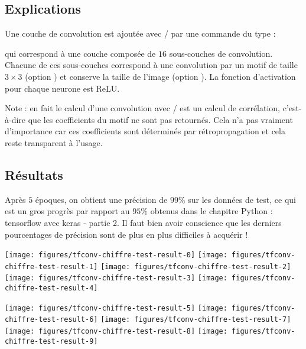 \documentclass[11pt,class=report,crop=false]{standalone}
\begin{document}
\subsection{Explications}

Une couche de convolution est ajoutée avec \tensorflow/\keras{} par une commande du type :

qui correspond à une couche composée de $16$ sous-couches de convolution. 
Chacune de ces sous-couches correspond à une convolution par un motif de taille $3\times 3$ (option ) et conserve la taille de l'image (option ).
La fonction d'activation pour chaque neurone est \og{}ReLU\fg{}.

Note : en fait le calcul d'une \og{}convolution\fg{} avec \tensorflow/\keras{} est un calcul de corrélation, c'est-à-dire que les coefficients du motif ne sont pas retournés. Cela n'a pas vraiment d'importance car ces coefficients sont déterminés par rétropropagation et cela reste transparent à l'usage. 

\subsection{Résultats}

Après $5$ époques, on obtient une précision de $99\%$ sur les données de test, ce qui est un gros progrès par rapport au $95\%$ obtenus dans le chapitre \og{}Python : tensorflow avec keras - partie 2\fg{}. Il faut bien avoir conscience que les derniers pourcentages de précision sont de plus en plus difficiles à acquérir !


\begin{center}
\texttt{[image: figures/tfconv-chiffre-test-result-0]}
\texttt{[image: figures/tfconv-chiffre-test-result-1]}
\texttt{[image: figures/tfconv-chiffre-test-result-2]}
\texttt{[image: figures/tfconv-chiffre-test-result-3]}
\texttt{[image: figures/tfconv-chiffre-test-result-4]}
\end{center}
\begin{center}
\texttt{[image: figures/tfconv-chiffre-test-result-5]}
\texttt{[image: figures/tfconv-chiffre-test-result-6]}
\texttt{[image: figures/tfconv-chiffre-test-result-7]}
\texttt{[image: figures/tfconv-chiffre-test-result-8]}
\texttt{[image: figures/tfconv-chiffre-test-result-9]}
\end{center}
\end{document}
